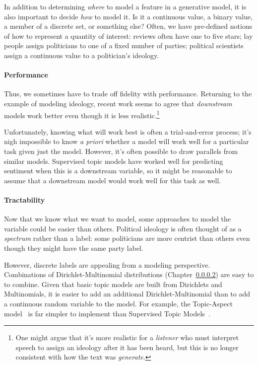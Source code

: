 In addition to determining \emph{where} to model a feature in a
generative model, it is also important to decide \emph{how} to model
it.  Is it a continuous value, a binary value, a member of a discrete
set, or something else?  Often, we have pre-defined notions of how to
represent a quantity of interest: reviews often have one to five
stars; lay people assign politicians to one of a fixed number of
parties; political scientists assign a continuous value to a
politician's ideology.



\paragraph{Performance}

Thus, we sometimes have to trade off fidelity with performance.
Returning to the example of modeling ideology, recent work seems to
agree that \emph{downstream} models work better even though it is
less realistic.\footnote{One might argue that it's more realistic for
  a \emph{listener} who must interpret speech to assign an ideology
  after it has been heard, but this is no longer consistent with how
  the text was \emph{generate}.}

Unfortunately, knowing what will work best is often a trial-and-error
process; it's nigh impossible to know \textit{a priori} whether a
model will work well for a particular task given just the model.
However, it's often possible to draw parallels from similar models.
Supervised topic models have worked well for predicting sentiment when
this is a downstream variable, so it might be reasonable to assume
that a downstream model would work well for this task as well.

\paragraph{Tractability}

Now that we know what we want to model, some approaches to model the
variable could be easier than others.  Political ideology is often
thought of as a \emph{spectrum} rather than a label: some politicians
are more centrist than others even though they might have the same
party label.

However, discrete labels are appealing from a modeling perspective.
Combinations of Dirichlet-Multinomial distributions (Chapter~\ref{})
are easy to to combine.  Given that basic topic models are built from
Dirichlets and Multinomials, it is easier to add an additional
Dirichlet-Multinomial than to add a continuous random variable to the
model.  For example, the Topic-Aspect model~\citep{} is far simpler to
implement than Supervised Topic Models~\citep{}.

